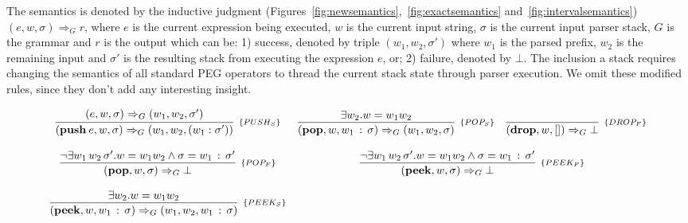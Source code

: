 \documentclass[sigplan,screen]{acmart}
\theoremstyle{definition}
\begin{document}
The semantics is denoted by the inductive judgment
(Figures~\ref{fig:newsemantics},~\ref{fig:exactsemantics} and~\ref{fig:intervalsemantics})
$(e, w, \sigma) \Rightarrow_G r$,
where $e$ is the current expression being executed, $w$ is the current input string,
$\sigma$ is the current input parser stack, $G$ is the grammar and $r$ is the output
which can be: 1) success, denoted by triple $(w_1,w_2,\sigma')$ where $w_1$
is the parsed prefix, $w_2$ is the remaining input and $\sigma'$ is the resulting
stack from executing the expression $e$, or; 2) failure, denoted by $\bot$.
The inclusion a stack requires changing the semantics of all standard PEG
operators to thread the current stack state through parser execution.
We omit these modified rules, since they don't add any interesting insight.
\begin{figure}[h!]
  \[
    \begin{array}{ccc}
      \infer[_{\{PUSH_S\}}]
             {(\mathbf{push}\:e,w,\sigma) \Rightarrow_G (w_1, w_2, (w_1:\sigma'))}
             {(e,w,\sigma)\Rightarrow_G (w_1,w_2,\sigma')} &
      \infer[_{\{POP_S\}}]
            {(\mathbf{pop},w,w_1\,:\,\sigma)\Rightarrow_G (w_1,w_2,\sigma)}
            {\exists w_2. w = w_1w_2} &
        \infer[_{\{DROP_F\}}]
              {(\mathbf{drop},w,[])\Rightarrow_G \bot}{}\\
       & & \\
      \infer[_{\{POP_F\}}]
            {(\mathbf{pop},w,\sigma)\Rightarrow_G \bot}
            {\neg \exists w_1\,w_2\, \sigma'. w = w_1w_2 \land \sigma = w_1\,:\,\sigma'}
      &
      \multicolumn{2}{c}{
        \infer[_{\{PEEK_F\}}]
              {(\mathbf{peek},w,\sigma)\Rightarrow_G \bot}
              {\neg \exists w_1\,w_2\, \sigma'. w = w_1w_2 \land \sigma = w_1\,:\,\sigma'}
      }\\\\
      \infer[_{\{PEEK_S\}}]
              {(\mathbf{peek},w,w_1\,:\,\sigma)\Rightarrow_G (w_1,w_2,w_1 \,:\,\sigma)}
              {\exists w_2. w = w_1w_2} &


\end{array}\]
\end{figure}
\end{document}
